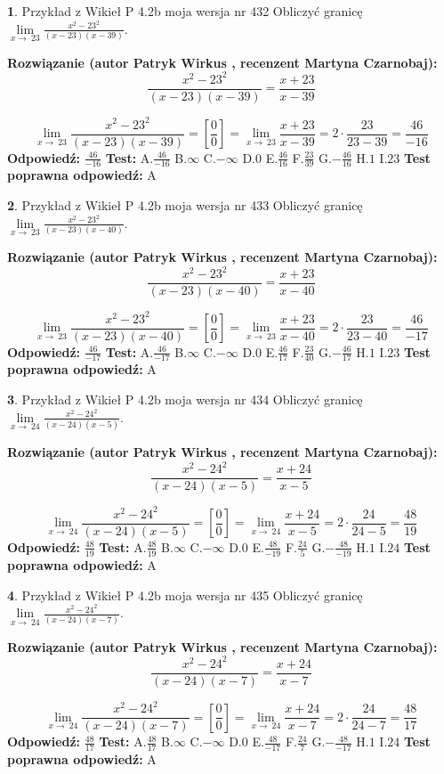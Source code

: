 \documentclass[12pt, a4paper]{article}
\theoremstyle{definition} %
\newtheorem{zad}{}
\newcommand{\zadStart}[1]{\begin{zad}#1\newline}
\newcommand{\zadStop}{\end{zad}}
\newcommand{\rozwStart}[2]{\noindent \textbf{Rozwiązanie (autor #1 , recenzent #2): }\newline}
\newcommand{\rozwStop}{\newline}
\newcommand{\odpStart}{\noindent \textbf{Odpowiedź:}\newline}
\newcommand{\odpStop}{\newline}
\newcommand{\testStart}{\noindent \textbf{Test:}\newline}
\newcommand{\testStop}{\newline}
\newcommand{\kluczStart}{\noindent \textbf{Test poprawna odpowiedź:}\newline}
\newcommand{\kluczStop}{\newline}
\begin{document}
\zadStart{Przykład z Wikieł P 4.2b moja wersja nr 432}
Obliczyć granicę $\lim\limits_{x\to\ 23}\frac{x^{2}-23^{2}}{(x-23)(x-39)}$.
\zadStop
\rozwStart{Patryk Wirkus}{Martyna Czarnobaj}
$$\frac{x^{2}-23^{2}}{(x-23)(x-39)}=\frac{x+23}{x-39}$$

$$\lim\limits_{x\to\ 23}\frac{x^{2}-23^{2}}{(x-23)(x-39)}=[\frac{0}{0}]=\lim\limits_{x\to\ 23}\frac{x+23}{x-39}=2 \cdot \frac{23}{23-39} = \frac{46}{-16}$$
\rozwStop
\odpStart
$\frac{46}{-16}$
\odpStop
\testStart
A.$\frac{46}{-16}$
B.$\infty$
C.$-\infty$
D.$0$
E.$\frac{46}{16}$
F.$\frac{23}{39}$
G.$-\frac{46}{16}$
H.$1$
I.$23$
\testStop
\kluczStart
A
\kluczStop



\zadStart{Przykład z Wikieł P 4.2b moja wersja nr 433}
Obliczyć granicę $\lim\limits_{x\to\ 23}\frac{x^{2}-23^{2}}{(x-23)(x-40)}$.
\zadStop
\rozwStart{Patryk Wirkus}{Martyna Czarnobaj}
$$\frac{x^{2}-23^{2}}{(x-23)(x-40)}=\frac{x+23}{x-40}$$

$$\lim\limits_{x\to\ 23}\frac{x^{2}-23^{2}}{(x-23)(x-40)}=[\frac{0}{0}]=\lim\limits_{x\to\ 23}\frac{x+23}{x-40}=2 \cdot \frac{23}{23-40} = \frac{46}{-17}$$
\rozwStop
\odpStart
$\frac{46}{-17}$
\odpStop
\testStart
A.$\frac{46}{-17}$
B.$\infty$
C.$-\infty$
D.$0$
E.$\frac{46}{17}$
F.$\frac{23}{40}$
G.$-\frac{46}{17}$
H.$1$
I.$23$
\testStop
\kluczStart
A
\kluczStop



\zadStart{Przykład z Wikieł P 4.2b moja wersja nr 434}
Obliczyć granicę $\lim\limits_{x\to\ 24}\frac{x^{2}-24^{2}}{(x-24)(x-5)}$.
\zadStop
\rozwStart{Patryk Wirkus}{Martyna Czarnobaj}
$$\frac{x^{2}-24^{2}}{(x-24)(x-5)}=\frac{x+24}{x-5}$$

$$\lim\limits_{x\to\ 24}\frac{x^{2}-24^{2}}{(x-24)(x-5)}=[\frac{0}{0}]=\lim\limits_{x\to\ 24}\frac{x+24}{x-5}=2 \cdot \frac{24}{24-5} = \frac{48}{19}$$
\rozwStop
\odpStart
$\frac{48}{19}$
\odpStop
\testStart
A.$\frac{48}{19}$
B.$\infty$
C.$-\infty$
D.$0$
E.$\frac{48}{-19}$
F.$\frac{24}{5}$
G.$-\frac{48}{-19}$
H.$1$
I.$24$
\testStop
\kluczStart
A
\kluczStop



\zadStart{Przykład z Wikieł P 4.2b moja wersja nr 435}
Obliczyć granicę $\lim\limits_{x\to\ 24}\frac{x^{2}-24^{2}}{(x-24)(x-7)}$.
\zadStop
\rozwStart{Patryk Wirkus}{Martyna Czarnobaj}
$$\frac{x^{2}-24^{2}}{(x-24)(x-7)}=\frac{x+24}{x-7}$$

$$\lim\limits_{x\to\ 24}\frac{x^{2}-24^{2}}{(x-24)(x-7)}=[\frac{0}{0}]=\lim\limits_{x\to\ 24}\frac{x+24}{x-7}=2 \cdot \frac{24}{24-7} = \frac{48}{17}$$
\rozwStop
\odpStart
$\frac{48}{17}$
\odpStop
\testStart
A.$\frac{48}{17}$
B.$\infty$
C.$-\infty$
D.$0$
E.$\frac{48}{-17}$
F.$\frac{24}{7}$
G.$-\frac{48}{-17}$
H.$1$
I.$24$
\testStop
\kluczStart
A
\kluczStop
\end{document}
